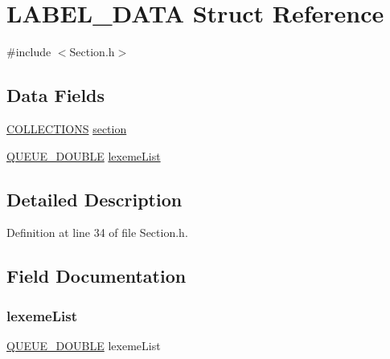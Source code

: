 \hypertarget{struct_l_a_b_e_l___d_a_t_a}{}\section{L\+A\+B\+E\+L\+\_\+\+D\+A\+TA Struct Reference}
\label{struct_l_a_b_e_l___d_a_t_a}


{\ttfamily \#include $<$Section.\+h$>$}

\subsection*{Data Fields}
\begin{DoxyCompactItemize}
\item 
\mbox{\hyperlink{_f_s_m_collection_8h_a25f9142504106abec10ec63d2a9be4cd}{C\+O\+L\+L\+E\+C\+T\+I\+O\+NS}} \mbox{\hyperlink{struct_l_a_b_e_l___d_a_t_a_a33bc2666034b9f205e5504b6a929176f}{section}}
\item 
\mbox{\hyperlink{_double_queue_generic_8h_ac9780889f9bbabed708ecbeaadfb040e}{Q\+U\+E\+U\+E\+\_\+\+D\+O\+U\+B\+LE}} \mbox{\hyperlink{struct_l_a_b_e_l___d_a_t_a_a04851637af6aefabcd6f9c48d82101e1}{lexeme\+List}}
\end{DoxyCompactItemize}


\subsection{Detailed Description}


Definition at line 34 of file Section.\+h.



\subsection{Field Documentation}
\mbox{\label{struct_l_a_b_e_l___d_a_t_a_a04851637af6aefabcd6f9c48d82101e1}} 
\subsubsection{\texorpdfstring{lexeme\+List}{lexemeList}}
{\footnotesize\ttfamily \mbox{\hyperlink{_double_queue_generic_8h_ac9780889f9bbabed708ecbeaadfb040e}{Q\+U\+E\+U\+E\+\_\+\+D\+O\+U\+B\+LE}} lexeme\+List}



